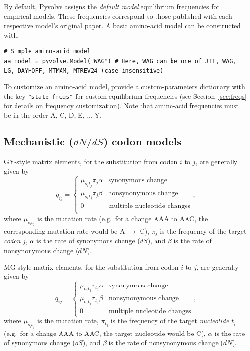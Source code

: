 \documentclass{article}
\newcommand{\code}[1]{\texttt{\small{#1}}}
\begin{document}
By default, Pyvolve assigns the \emph{default model} equilibrium frequencies for empirical models. These frequencies correspond to those published with each respective model's original paper.  A basic amino-acid model can be constructed with,
\begin{lstlisting}
# Simple amino-acid model
aa_model = pyvolve.Model("WAG") # Here, WAG can be one of JTT, WAG, LG, DAYHOFF, MTMAM, MTREV24 (case-insensitive)
\end{lstlisting}

To customize an amino-acid model, provide a custom-parameters dictionary with the key \code{"state\_freqs"} for custom equilibrium frequencies (see Section~\ref{sec:freqs} for details on frequency customization). Note that amino-acid frequencies must be in the order A, C, D, E, ... Y.



\subsection{Mechanistic ($dN/dS$) codon models}\label{sec:mechcodon_basic}

GY-style \citep{GY94} matrix elements, for the substitution from codon $i$ to $j$, are generally given by
\begin{equation}\label{eq:GY94}
q_{ij} = \left\{
\begin{array}{rl}
\mu_{o_it_j} \pi_j \alpha      & \text{synonymous change} \\
\mu_{o_it_j} \pi_j \beta       & \text{nonsynonymous change} \\
0                    & \text{multiple nucleotide changes} \\
\end{array} \right.,
\end{equation}
where $\mu_{o_it_j}$ is the mutation rate (e.g.\ for a change AAA to AAC, the corresponding mutation rate would be A $\rightarrow$ C), $\pi_j$ is the frequency of the target \emph{codon} $j$, $\alpha$ is the rate of synonymous change ($dS$), and $\beta$ is the rate of nonsynonymous change ($dN$).


MG-style \citep{MG94} matrix elements, for the substitution from codon $i$ to $j$, are generally given by
\begin{equation}\label{eq:MGstyle}
q_{ij} = \left\{
\begin{array}{rl}
\mu_{o_it_j}\pi_{t_j} \alpha         &\text{synonymous change} \\
\mu_{o_it_j}\pi_{t_j} \beta  &\text{nonsynonymous change} \\
0                             &\text{multiple nucleotide changes}
\end{array} \right. ,
\end{equation}
where $\mu_{o_it_j}$ is the mutation rate, $\pi_{t_j}$ is the frequency of the target \emph{nucleotide} $t_j$ (e.g.\ for a change AAA to AAC, the target nucleotide would be C), $\alpha$ is the rate of synonymous change ($dS$), and $\beta$ is the rate of nonsynonymous change ($dN$).
\end{document}
